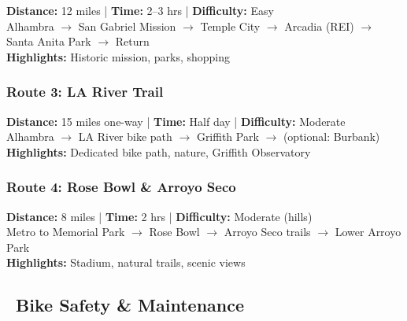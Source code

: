 \documentclass[10pt,letterpaper]{article}
\begin{document}
\begin{routebox}
\textbf{Distance:} 12 miles | \textbf{Time:} 2--3 hrs | \textbf{Difficulty:} Easy\\[3pt]
Alhambra $\rightarrow$ San Gabriel Mission $\rightarrow$ Temple City $\rightarrow$ Arcadia (REI) $\rightarrow$ Santa Anita Park $\rightarrow$ Return\\[3pt]
\textbf{Highlights:} Historic mission, parks, shopping
\end{routebox}

\subsubsection*{Route 3: LA River Trail}

\begin{routebox}
\textbf{Distance:} 15 miles one-way | \textbf{Time:} Half day | \textbf{Difficulty:} Moderate\\[3pt]
Alhambra $\rightarrow$ LA River bike path $\rightarrow$ Griffith Park $\rightarrow$ (optional: Burbank)\\[3pt]
\textbf{Highlights:} Dedicated bike path, nature, Griffith Observatory
\end{routebox}

\subsubsection*{Route 4: Rose Bowl \& Arroyo Seco}

\begin{routebox}
\textbf{Distance:} 8 miles | \textbf{Time:} 2 hrs | \textbf{Difficulty:} Moderate (hills)\\[3pt]
Metro to Memorial Park $\rightarrow$ Rose Bowl $\rightarrow$ Arroyo Seco trails $\rightarrow$ Lower Arroyo Park\\[3pt]
\textbf{Highlights:} Stadium, natural trails, scenic views
\end{routebox}

\subsection*{\faWrench\ Bike Safety \& Maintenance}
\end{document}
